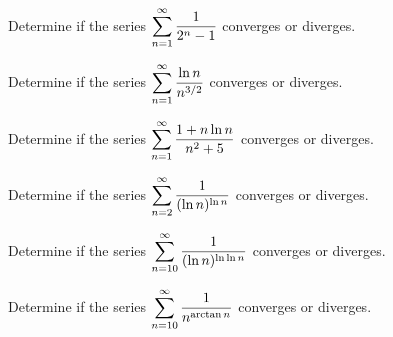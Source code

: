 \newpage

\begin{example}
Determine if the series $\displaystyle\sum_{n=1}^\infty\frac{1}{2^n-1}$ converges or diverges.
\end{example}

\newpage

\begin{example}
Determine if the series $\displaystyle\sum_{n=1}^\infty\frac{\ln n}{n^{3/2}}$ converges or diverges.
\end{example}

\newpage

\begin{example}
Determine if the series $\displaystyle\sum_{n=1}^\infty\frac{1+n\ln n}{n^2+5}$ converges or diverges.
\end{example}

\newpage

\begin{example}
Determine if the series $\displaystyle\sum_{n=2}^\infty\frac{1}{(\ln n)^{\ln n}}$ converges or diverges.
\end{example}

\newpage

\begin{example}
Determine if the series $\displaystyle\sum_{n=10}^\infty\frac{1}{(\ln n)^{\ln\ln n}}$ converges or diverges.
\end{example}

\newpage

\begin{example}
Determine if the series $\displaystyle\sum_{n=10}^\infty\frac{1}{n^{\arctan n}}$ converges or diverges.
\end{example}
